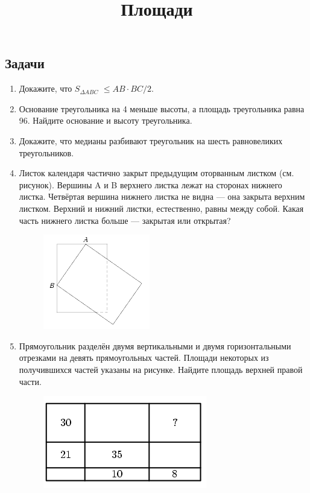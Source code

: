 \documentclass[a4paper,12pt]{article}
\title{Площади}
\begin{document}
\maketitle
    \subsection*{Задачи}
    \begin{enumerate}
        \item Докажите, что  $S_ {\Delta ABC}$ $ \leq AB \cdot BC/2$.
        \item Основание треугольника на 4 меньше высоты, а площадь треугольника равна 96. Найдите основание и высоту треугольника. 
        \item Докажите, что медианы разбивают треугольник на шесть равновеликих треугольников.
        \item Листок календаря частично закрыт предыдущим оторванным листком (см. рисунок). Вершины A и B верхнего листка лежат на сторонах нижнего листка. Четвёртая вершина нижнего листка не видна  — она закрыта верхним листком. Верхний и нижний листки, естественно, равны между собой. Какая часть нижнего листка больше  — закрытая или открытая?
        \begin{figure}[h]
            \centering
            \includegraphics[width=0.25\linewidth]{image1.png}
        \end{figure}
        \item Прямоугольник разделён двумя вертикальными и двумя горизонтальными отрезками на девять прямоугольных частей. Площади некоторых из получившихся частей указаны на рисунке. Найдите площадь верхней правой части.
        \begin{figure}[h]
                        \centering
            \includegraphics[width=0.25\linewidth]{image.png}
        \end{figure}
                
    \end{enumerate}
\end{document}
